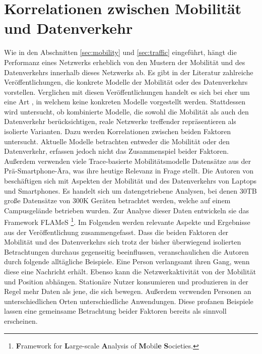 \documentclass[12pt, a4paper]{article}
\begin{document}
\section{Korrelationen zwischen Mobilität und Datenverkehr}
\label{sec:correlations}

Wie in den Abschnitten \ref{sec:mobility} und \ref{sec:traffic} eingeführt, hängt die Performanz eines
Netzwerks erheblich von den Mustern der Mobilität und des Datenverkehrs innerhalb dieses Netzwerks ab.
Es gibt in der Literatur zahlreiche Veröffentlichungen, die konkrete Modelle der Mobilität oder des Datenverkehrs
vorstellen. Verglichen mit diesen Veröffentlichungen handelt es sich bei \cite{Alipour2018} eher um eine Art 
, in welchem keine konkreten Modelle vorgestellt werden. Stattdessen wird untersucht, 
ob kombinierte Modelle, die sowohl die Mobilität als auch den Datenverkehr berücksichtigen, reale Netzwerke 
treffender repräsentieren als isolierte Varianten. Dazu werden Korrelationen zwischen beiden Faktoren untersucht.\newline
Aktuelle Modelle betrachten entweder die Mobilität oder den Datenverkehr, erfassen jedoch nicht das Zusammenspiel beider Faktoren.
Außerdem verwenden viele Trace-basierte Mobilitätsmodelle Datensätze aus der Prä-Smartphone-Ära,
was ihre heutige Relevanz in Frage stellt. \cite{Alipour2018}
Die Autoren von \cite{Alipour2018} beschäftigen sich mit Aspekten der Mobilität und des Datenverkehrs von Laptops und Smartphones.
Es handelt sich um datengetriebene Analysen, bei denen $30$\textsc{TB} große Datensätze von $300$\textsc{K} Geräten betrachtet werden,
welche auf einem Campusgelände betrieben wurden. Zur Analyse dieser Daten entwickeln sie das Framework FLAMeS 
\footnote{\textbf{F}ramework for \textbf{L}arge-scale \textbf{A}nalysis of \textbf{M}obil\textbf{e} \textbf{S}ocieties.}.
Im Folgenden werden relevante Aspekte und Ergebnisse aus der Veröffentlichung zusammengefasst.\newline
Dass die beiden Faktoren der Mobilität und des Datenverkehrs sich trotz der bisher überwiegend isolierten Betrachtungen
durchaus gegenseitig beeinflussen, veranschaulichen die Autoren durch folgende alltägliche Beispiele. 
Eine Person verlangsamt ihren Gang, wenn diese eine Nachricht erhält. Ebenso kann die Netzwerkaktivität von der
Mobilität und Position abhängen. Stationäre Nutzer konsumieren und produzieren in der Regel mehr Daten als jene, 
die sich bewegen. Außerdem verwenden Personen an unterschiedlichen Orten unterschiedliche Anwendungen.
Diese profanen Beispiele lassen eine gemeinsame Betrachtung beider Faktoren bereits als sinnvoll erscheinen.
\end{document}
